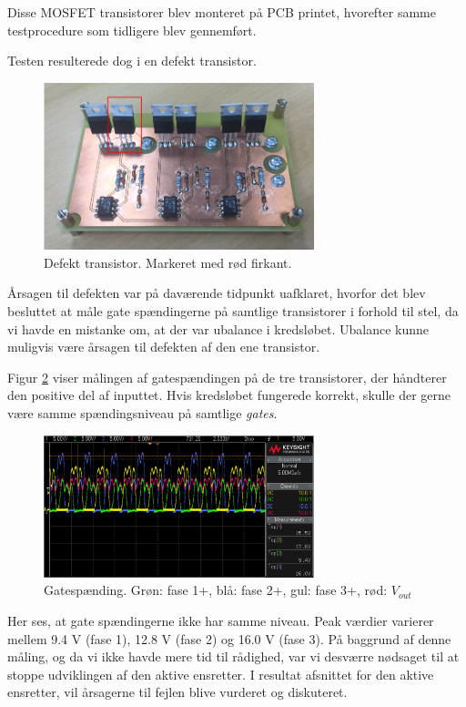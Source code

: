 Disse MOSFET transistorer blev monteret på PCB printet, hvorefter samme testprocedure som tidligere blev gennemført.  

Testen resulterede dog i en defekt transistor.

\begin{figure}[h]
  \centering
  \includegraphics[width=0.7\textwidth]{./figurer/nt8.png}
  \caption{Defekt transistor. Markeret med rød firkant.}
  \label{fig:nt8}
\end{figure}

Årsagen til defekten var på daværende tidpunkt uafklaret, hvorfor det blev besluttet at måle gate spændingerne på samtlige transistorer i forhold til stel, da vi havde en mistanke om, at der var ubalance i kredsløbet. Ubalance kunne muligvis være årsagen til defekten af den ene transistor. 

Figur \ref{fig:nt9} viser målingen af gatespændingen på de tre transistorer, der håndterer den positive del af inputtet. Hvis kredsløbet fungerede korrekt, skulle der gerne være samme spændingsniveau på samtlige \textit{gates}. 
\clearpage
\begin{figure}[h]
  \centering
  \includegraphics[width=0.7\textwidth]{./figurer/nt9.png}
  \caption{Gatespænding. Grøn: fase 1+, blå: fase 2+, gul: fase 3+, rød: $V_{out}$}
  \label{fig:nt9}
\end{figure}

Her ses, at gate spændingerne ikke har samme niveau. Peak værdier varierer mellem 9.4 V (fase 1), 12.8 V (fase 2) og 16.0 V (fase 3). På baggrund af denne måling, og da vi ikke havde mere tid til rådighed, var vi desværre nødsaget til at stoppe udviklingen af den aktive ensretter. I resultat afsnittet for den aktive ensretter, vil årsagerne til fejlen blive vurderet og diskuteret. 


